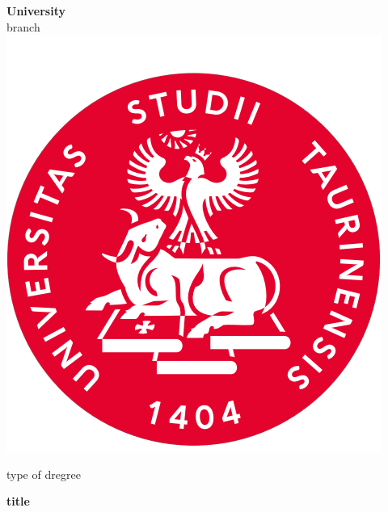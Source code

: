 \begin{titlepage}

\begin{center}
    \textbf{\huge{University}}  %
    \vspace{2mm}
    \\ \LARGE{branch}           %
    \vspace{5mm}
    \\ \includegraphics[keepaspectratio=true,scale=0.4]{images/unito_logo.png}
    \vspace{5mm}
\end{center}

\begin{center}
    \LARGE{type of dregree}     %
\end{center}

\vspace{15mm}
\begin{center}
    \textbf{\huge{title}}       %
\end{center}
\vspace{30mm}


\end{titlepage}
